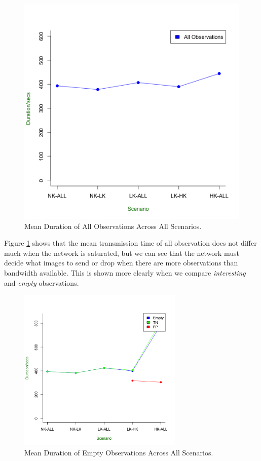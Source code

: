 	\begin{figure}[h]
	\centering
	\includegraphics[width=\textwidth]{Chap7/figures/saturated/total_dur}
	\caption{Mean Duration of All Observations Across All Scenarios.}
	\label{fig:sat:total:dur}
	\end{figure}

Figure \ref{fig:sat:total:dur} shows that the mean transmission time of all observation does not differ much when the network is saturated, but we can see that the network must decide what images to send or drop when there are more observations than bandwidth available. This is shown more clearly when we compare \textit{interesting} and \textit{empty} observations. 

	\begin{figure}[h]
	\centering
	\includegraphics[width=0.70\textwidth]{Chap7/figures/saturated/empty_dur}
	\caption{Mean Duration of Empty Observations Across All Scenarios.}
	\label{fig:sat:empty:dur}
	\end{figure}

